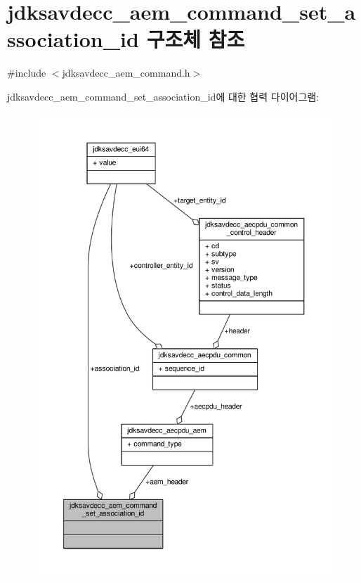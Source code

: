\hypertarget{structjdksavdecc__aem__command__set__association__id}{}\section{jdksavdecc\+\_\+aem\+\_\+command\+\_\+set\+\_\+association\+\_\+id 구조체 참조}
\label{structjdksavdecc__aem__command__set__association__id}


{\ttfamily \#include $<$jdksavdecc\+\_\+aem\+\_\+command.\+h$>$}



jdksavdecc\+\_\+aem\+\_\+command\+\_\+set\+\_\+association\+\_\+id에 대한 협력 다이어그램\+:
\nopagebreak
\begin{figure}[H]
\begin{center}
\leavevmode
\includegraphics[width=350pt]{structjdksavdecc__aem__command__set__association__id__coll__graph}
\end{center}
\end{figure}
